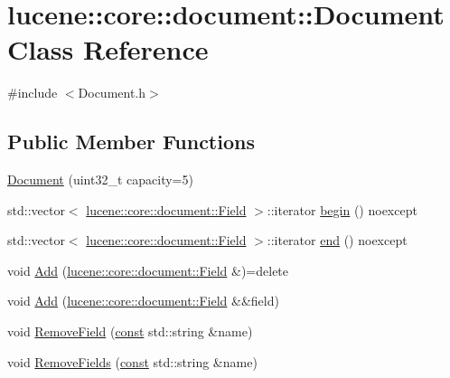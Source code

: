 \hypertarget{classlucene_1_1core_1_1document_1_1Document}{}\section{lucene\+:\+:core\+:\+:document\+:\+:Document Class Reference}
\label{classlucene_1_1core_1_1document_1_1Document}


{\ttfamily \#include $<$Document.\+h$>$}

\subsection*{Public Member Functions}
\begin{DoxyCompactItemize}
\item 
\mbox{\hyperlink{classlucene_1_1core_1_1document_1_1Document_acd273693f28b42b99480204b5177dccc}{Document}} (uint32\+\_\+t capacity=5)
\item 
std\+::vector$<$ \mbox{\hyperlink{classlucene_1_1core_1_1document_1_1Field}{lucene\+::core\+::document\+::\+Field}} $>$\+::iterator \mbox{\hyperlink{classlucene_1_1core_1_1document_1_1Document_a9e2fe1fe52a48c074942095ef62266cc}{begin}} () noexcept
\item 
std\+::vector$<$ \mbox{\hyperlink{classlucene_1_1core_1_1document_1_1Field}{lucene\+::core\+::document\+::\+Field}} $>$\+::iterator \mbox{\hyperlink{classlucene_1_1core_1_1document_1_1Document_ad0a1cb1cadecb670e770ee744a48a619}{end}} () noexcept
\item 
void \mbox{\hyperlink{classlucene_1_1core_1_1document_1_1Document_a0a2a27b34f85668dffba51957c13b02f}{Add}} (\mbox{\hyperlink{classlucene_1_1core_1_1document_1_1Field}{lucene\+::core\+::document\+::\+Field}} \&)=delete
\item 
void \mbox{\hyperlink{classlucene_1_1core_1_1document_1_1Document_a2cc46edf9624c9329c2dec16a4647983}{Add}} (\mbox{\hyperlink{classlucene_1_1core_1_1document_1_1Field}{lucene\+::core\+::document\+::\+Field}} \&\&field)
\item 
void \mbox{\hyperlink{classlucene_1_1core_1_1document_1_1Document_a20e7e07a35682bb94c77b6e1dc0f0a8a}{Remove\+Field}} (\mbox{\hyperlink{ZlibCrc32_8h_a2c212835823e3c54a8ab6d95c652660e}{const}} std\+::string \&name)
\item 
void \mbox{\hyperlink{classlucene_1_1core_1_1document_1_1Document_a151221f80667ee317ca8db358e4052e2}{Remove\+Fields}} (\mbox{\hyperlink{ZlibCrc32_8h_a2c212835823e3c54a8ab6d95c652660e}{const}} std\+::string \&name)

\end{DoxyCompactItemize}
